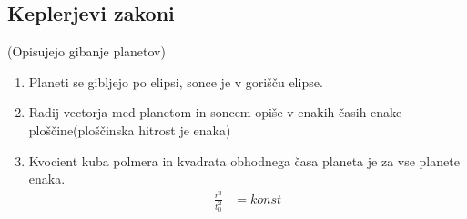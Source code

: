 {\color{indiagreen}\subsection{Keplerjevi zakoni}}
(Opisujejo gibanje planetov)\\
\begin{enumerate}
	\item Planeti se gibljejo po elipsi, sonce je v gorišču elipse.
	\item Radij vectorja med planetom in soncem opiše v enakih časih enake ploščine(ploščinska hitrost je enaka)
	\item Kvocient kuba polmera in kvadrata obhodnega časa planeta je za vse planete enaka.
	\begin{align*}
		\frac{r^3}{t_0^2} &= konst\\
	\end{align*}
\end{enumerate}